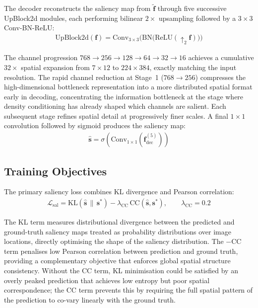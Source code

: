 \documentclass[twocolumn]{article}
\begin{document}
The decoder reconstructs the saliency map from $\tilde{\mathbf{f}}$ through
five successive UpBlock2d modules, each performing bilinear $2\times$
upsampling followed by a $3\times3$ Conv-BN-ReLU:
\begin{align}
  \mathrm{UpBlock2d}(\mathbf{f}) =
  \mathrm{Conv}_{3\times3}\!\bigl(\mathrm{BN}\bigl(\mathrm{ReLU}(\uparrow_2 \mathbf{f})\bigr)\bigr)
  \label{eq:upblock}
\end{align}

The channel progression $768\!\to\!256\!\to\!128\!\to\!64\!\to\!32\!\to\!16$
achieves a cumulative $32\times$ spatial expansion from $7\!\times\!12$ to
$224\!\times\!384$, exactly matching the input resolution.  The rapid
channel reduction at Stage~1 ($768\to256$) compresses the high-dimensional
bottleneck representation into a more distributed spatial format early in
decoding, concentrating the information bottleneck at the stage where
density conditioning has already shaped which channels are salient.  Each
subsequent stage refines spatial detail at progressively finer scales.  A
final $1\!\times\!1$ convolution followed by sigmoid produces the saliency
map:
\begin{align}
  \hat{\mathbf{s}} = \sigma\!\left(\mathrm{Conv}_{1\times1}
  \!\left(\mathbf{f}^{(5)}_\mathrm{dec}\right)\right)
  \label{eq:sigmoid}
\end{align}

\subsection{Training Objectives}

The primary saliency loss combines KL divergence and Pearson correlation:
\begin{align}
  \mathcal{L}_\mathrm{sal} =
  \mathrm{KL}\!\left(\hat{\mathbf{s}} \,\|\, \mathbf{s}^{*}\right)
  - \lambda_\mathrm{CC}\, \mathrm{CC}(\hat{\mathbf{s}}, \mathbf{s}^{*}),
  \qquad \lambda_\mathrm{CC}\!=\!0.2
  \label{eq:sal_loss}
\end{align}

The KL term measures distributional divergence between the predicted and
ground-truth saliency maps treated as probability distributions over image
locations, directly optimising the shape of the saliency distribution.
The $-\mathrm{CC}$ term penalises low Pearson correlation between prediction
and ground truth, providing a complementary objective that enforces global
spatial structure consistency.  Without the CC term, KL minimisation could
be satisfied by an overly peaked prediction that achieves low entropy but
poor spatial correspondence; the CC term prevents this by requiring the
full spatial pattern of the prediction to co-vary linearly with the
ground truth.
\end{document}
